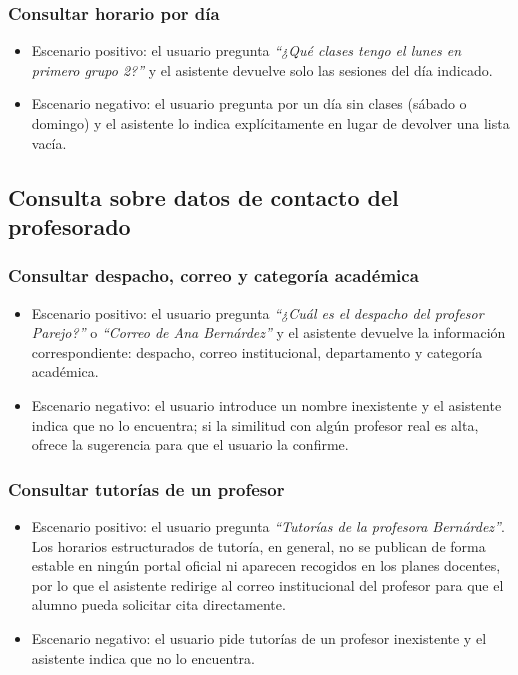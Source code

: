 \subsubsection{Consultar horario por día}

\begin{itemize}
    \item Escenario positivo: el usuario pregunta \textit{``¿Qué clases tengo el lunes en primero grupo 2?''} y el asistente devuelve solo las sesiones del día indicado.
    \item Escenario negativo: el usuario pregunta por un día sin clases (sábado o domingo) y el asistente lo indica explícitamente en lugar de devolver una lista vacía.
\end{itemize}

\subsection{Consulta sobre datos de contacto del profesorado}

\subsubsection{Consultar despacho, correo y categoría académica}

\begin{itemize}
    \item Escenario positivo: el usuario pregunta \textit{``¿Cuál es el despacho del profesor Parejo?''} o \textit{``Correo de Ana Bernárdez''} y el asistente devuelve la información correspondiente: despacho, correo institucional, departamento y categoría académica.
    \item Escenario negativo: el usuario introduce un nombre inexistente y el asistente indica que no lo encuentra; si la similitud con algún profesor real es alta, ofrece la sugerencia para que el usuario la confirme.
\end{itemize}

\subsubsection{Consultar tutorías de un profesor}\label{subsec:cu-tutorias}

\begin{itemize}
    \item Escenario positivo: el usuario pregunta \textit{``Tutorías de la profesora Bernárdez''}. Los horarios estructurados de tutoría, en general, no se publican de forma estable en ningún portal oficial ni aparecen recogidos en los planes docentes, por lo que el asistente redirige al correo institucional del profesor para que el alumno pueda solicitar cita directamente.
    \item Escenario negativo: el usuario pide tutorías de un profesor inexistente y el asistente indica que no lo encuentra.
\end{itemize}

